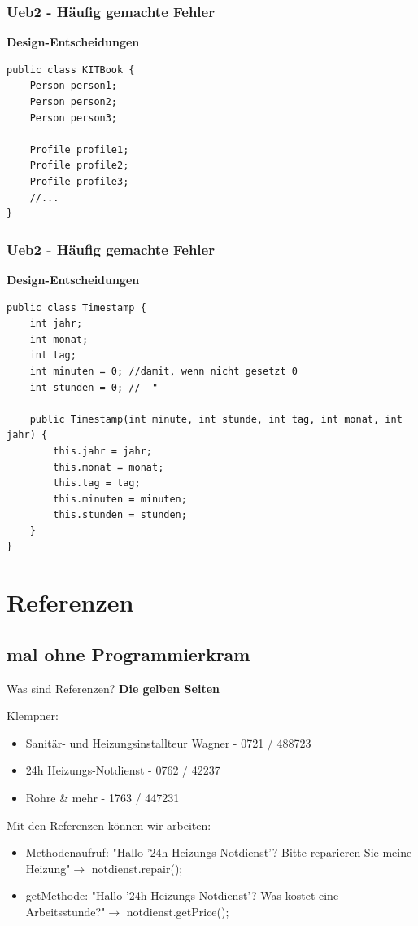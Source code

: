 \documentclass[18pt]{beamer}
\begin{document}
\begin{frame}[containsverbatim]
\frametitle{Ueb2 - Häufig gemachte Fehler}
		\textbf{Design-Entscheidungen}
		
		\begin{lstlisting}
public class KITBook {
	Person person1;
	Person person2;
	Person person3;
	
	Profile profile1;
	Profile profile2;
	Profile profile3;
	//...
}
		\end{lstlisting}
\end{frame}


\begin{frame}[containsverbatim]
\frametitle{Ueb2 - Häufig gemachte Fehler}
		\textbf{Design-Entscheidungen}
		
		\begin{lstlisting}
public class Timestamp {
	int jahr;
	int monat;
	int tag;
	int minuten = 0; //damit, wenn nicht gesetzt 0
	int stunden = 0; // -"-
	
	public Timestamp(int minute, int stunde, int tag, int monat, int jahr) {
		this.jahr = jahr;
		this.monat = monat;
		this.tag = tag;
		this.minuten = minuten;
		this.stunden = stunden;
	}
}
		\end{lstlisting}
\end{frame}


\section{Referenzen}
\subsection{mal ohne Programmierkram}
\begin{frame}{Was sind Referenzen?}
	\textbf{Die gelben Seiten}
	\pause
	
	Klempner: 
	\begin{itemize}
		\item Sanitär- und Heizungsinstallteur Wagner - 0721 / 488723
		\item 24h Heizungs-Notdienst - 0762 / 42237
		\item Rohre \& mehr - 1763 / 447231
	\end{itemize}
	\pause
	
	Mit den Referenzen können wir arbeiten:
	\begin{itemize}
		\item Methodenaufruf: "Hallo '24h Heizungs-Notdienst'? Bitte reparieren Sie meine Heizung"\pause  $\rightarrow$ notdienst.repair();\pause 
		\item getMethode: "Hallo '24h Heizungs-Notdienst'? Was kostet eine Arbeitsstunde?"\pause $\rightarrow$ notdienst.getPrice();\pause
	\end{itemize}
\end{frame}
\end{document}
